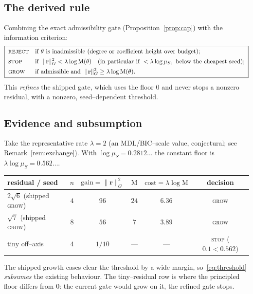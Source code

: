 \documentclass[11pt]{article}
\theoremstyle{plain}
\theoremstyle{definition}
\theoremstyle{remark}
\newcommand{\Mah}{\mathrm{M}}
\newcommand{\rr}{\mathbf{r}}
\newcommand{\GG}{G}
\begin{document}
\subsection{The derived rule}
Combining the exact admissibility gate (Proposition~\ref{prop:cap}) with the information criterion:
\begin{equation}\label{eq:threshold}
\boxed{\;
\begin{aligned}
  &\textsc{reject} && \text{if $\theta$ is inadmissible (degree or coefficient height over budget);}\\
  &\textsc{stop}   && \text{if }\ \lVert\rr\rVert_{\GG}^2<\lambda\log\Mah(\theta)
        \quad(\text{in particular if }<\lambda\log\mu_S,\ \text{below the cheapest seed});\\
  &\textsc{grow}   && \text{if admissible and }\ \lVert\rr\rVert_{\GG}^2\ge\lambda\log\Mah(\theta).
\end{aligned}\;}
\end{equation}
This \emph{refines} the shipped gate, which uses the floor $0$ and never stops a nonzero residual, with a
nonzero, seed--dependent threshold.

\subsection{Evidence and subsumption}
Take the representative rate $\lambda=2$ (an MDL/BIC--scale value, conjectural; see
Remark~\ref{rem:exchange}). With $\log\mu_S=0.2812\ldots$ the constant floor is $\lambda\log\mu_S=0.562\ldots$.
\begin{center}
\begin{tabular}{lccccc}
\toprule
residual / seed & $n$ & $\mathrm{gain}=\lVert\rr\rVert_{\GG}^2$ & $\Mah$ & $\mathrm{cost}=\lambda\log\Mah$ & decision \\
\midrule
$2\sqrt6$ (shipped \textsc{grow}) & $4$ & $96$ & $24$ & $6.36$ & \textsc{grow} \\
$\sqrt7$ (shipped \textsc{grow})  & $8$ & $56$ & $7$  & $3.89$ & \textsc{grow} \\
tiny off--axis & $4$ & $1/10$ & --- & --- & \textsc{stop} ($0.1<0.562$) \\
\bottomrule
\end{tabular}
\end{center}
The shipped growth cases clear the threshold by a wide margin, so~\eqref{eq:threshold} \emph{subsumes} the
existing behaviour. The tiny--residual row is where the principled floor differs from $0$: the current gate
would grow on it, the refined gate stops.
\end{document}

